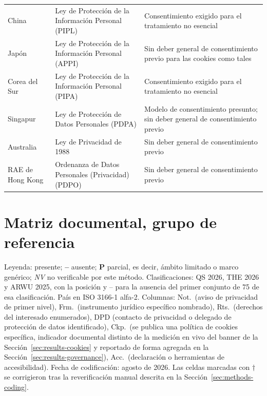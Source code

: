 \documentclass[pdflatex,sn-basic,Numbered,iicol]{sn-jnl}
\newcommand{\si}{\ding{51}}
\newcommand{\no}{\textcolor{gris}{\textbf{--}}}
\newcommand{\nv}{\textsl{\footnotesize NV}}
\theoremstyle{thmstyleone}
\theoremstyle{thmstyletwo}
\theoremstyle{thmstylethree}
\begin{document}
\begin{appendices}
\begin{longtable}{@{}>{\RaggedRight}p{2.4cm}>{\RaggedRight}p{5.5cm}>{\RaggedRight\arraybackslash}p{4.1cm}@{}}
	\addlinespace
	China & Ley de Protecci\'on de la Informaci\'on Personal (PIPL) \citep{pipl2021} & Consentimiento exigido para el tratamiento no esencial \\
	\addlinespace
	Jap\'on & Ley de Protecci\'on de la Informaci\'on Personal (APPI) \citep{appi2003} & Sin deber general de consentimiento previo para las cookies como tales \\
	\addlinespace
	Corea del Sur & Ley de Protecci\'on de la Informaci\'on Personal (PIPA) \citep{pipa2011} & Consentimiento exigido para el tratamiento no esencial \\
	\addlinespace
	Singapur & Ley de Protecci\'on de Datos Personales (PDPA) \citep{pdpa2012} & Modelo de consentimiento presunto; sin deber general de consentimiento previo \\
	\addlinespace
	Australia & Ley de Privacidad de 1988 \citep{privacyact1988} & Sin deber general de consentimiento previo \\
	\addlinespace
	RAE de Hong Kong & Ordenanza de Datos Personales (Privacidad) (PDPO) \citep{pdpo_hk} & Sin deber general de consentimiento previo \\
\end{longtable}
\normalsize

\section{Matriz documental, grupo de referencia}\label{ap:mundo}
\setcounter{table}{0}\setcounter{figure}{0}

Leyenda: \si{} presente; \no{} ausente; \textbf{P} parcial, es decir, \'ambito limitado o marco gen\'erico; \nv{} no verificable por este m\'etodo. Clasificaciones: QS 2026, THE 2026 y ARWU 2025, con la posici\'on y \guillemotleft --\guillemotright{} para la ausencia del primer conjunto de 75 de esa clasificaci\'on. Pa\'is en ISO 3166-1 alfa-2. Columnas: Not.\ (aviso de privacidad de primer nivel), Frm.\ (instrumento jur\'idico espec\'ifico nombrado), Rts.\ (derechos del interesado enumerados), DPD (contacto de privacidad o delegado de protecci\'on de datos identificado), Ckp.\ (se publica una pol\'itica de cookies espec\'ifica, indicador documental distinto de la medici\'on en vivo del banner de la Secci\'on~\ref{sec:results-cookies} y reportado de forma agregada en la Secci\'on~\ref{sec:results-governance}), Acc.\ (declaraci\'on o herramientas de accesibilidad). Fecha de codificaci\'on: agosto de 2026. Las celdas marcadas con $\dagger$ se corrigieron tras la reverificaci\'on manual descrita en la Secci\'on~\ref{sec:methods-coding}.


\end{appendices}
\end{document}
